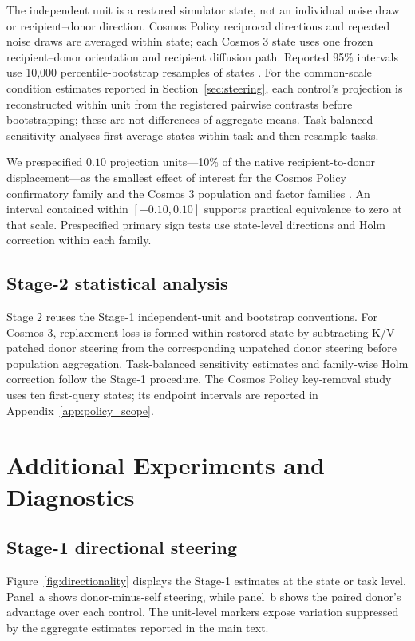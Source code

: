 \documentclass{article}
\begin{document}
The independent unit is a restored simulator state, not an individual noise draw or recipient--donor direction. Cosmos Policy reciprocal directions and repeated noise draws are averaged within state; each Cosmos 3 state uses one frozen recipient--donor orientation and recipient diffusion path. Reported 95\% intervals use 10,000 percentile-bootstrap resamples of states \citep{field2007clusterbootstrap}. For the common-scale condition estimates reported in Section~\ref{sec:steering}, each control's projection is reconstructed within unit from the registered pairwise contrasts before bootstrapping; these are not differences of aggregate means. Task-balanced sensitivity analyses first average states within task and then resample tasks.

We prespecified $0.10$ projection units---10\% of the native recipient-to-donor displacement---as the smallest effect of interest for the Cosmos Policy confirmatory family and the Cosmos 3 population and factor families \citep{lakens2017equivalence}. An interval contained within $[-0.10,0.10]$ supports practical equivalence to zero at that scale. Prespecified primary sign tests use state-level directions and Holm correction within each family.

\subsection{Stage-2 statistical analysis}
\label{app:stage2_stats}

Stage 2 reuses the Stage-1 independent-unit and bootstrap conventions. For Cosmos 3, replacement loss is formed within restored state by subtracting K/V-patched donor steering from the corresponding unpatched donor steering before population aggregation. Task-balanced sensitivity estimates and family-wise Holm correction follow the Stage-1 procedure. The Cosmos Policy key-removal study uses ten first-query states; its endpoint intervals are reported in Appendix~\ref{app:policy_scope}.

\section{Additional Experiments and Diagnostics}
\label{app:additional}

\subsection{Stage-1 directional steering}

Figure~\ref{fig:directionality} displays the Stage-1 estimates at the state or task level. Panel~a shows donor-minus-self steering, while panel~b shows the paired donor's advantage over each control. The unit-level markers expose variation suppressed by the aggregate estimates reported in the main text.
\end{document}
